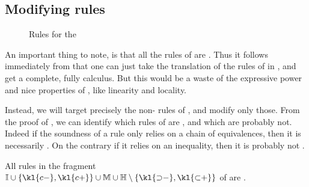 \subsection{Modifying rules}

\begin{figure*}
  
  \caption{Rules for the   }
\end{figure*}

An important thing to note, is that all the rules of  are
\emph{}. Thus it follows immediately from
 that one can just take the translation of the rules
of  in , and get a complete, fully 
calculus. But this would be a waste of the expressive power and nice properties
of , like linearity and locality.

Instead, we will target precisely the non- rules of ,
and modify only those. From the proof of , we
can identify which rules of  are , and which are
probably not. Indeed if the soundness of a rule only relies on a chain of
equivalences, then it is necessarily . On the contrary if it relies on
an inequality, then it is probably not .

\begin{fact}
  All rules in the fragment $\mathbb{I} \cup \{\kl{c{-}},\kl{c{+}}\} \cup
    \mathbb{M} \cup \mathbb{H} \setminus \{\kl{{\limp}{-}},\kl{{\lsub}{+}}\}$ of
   are .
\end{fact}

